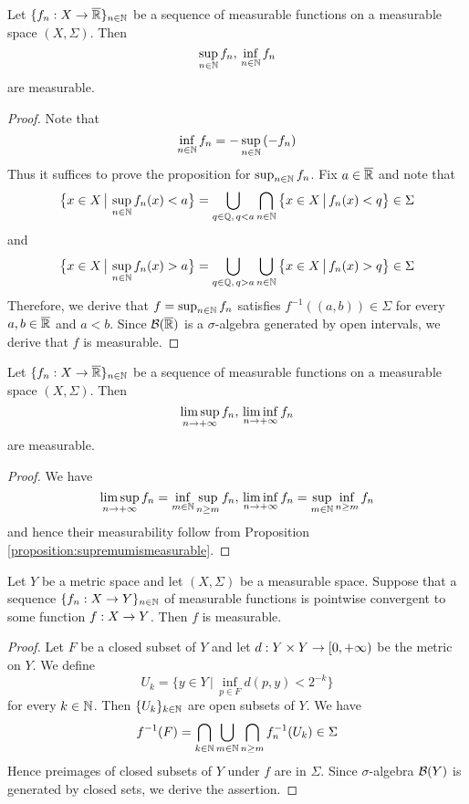 \begin{proposition}\label{proposition:supremumismeasurable}
Let $\{f_n:X\rightarrow \overline{{\mathbb R}}\}_{n\in {\mathbb N}}$ be a sequence of measurable functions on a measurable space $(X,\Sigma)$. Then
$$\sup_{n\in {\mathbb N}}f_n,\,\inf_{n\in {\mathbb N}}f_n$$
are measurable.
\end{proposition}
\begin{proof}
Note that
$$\inf_{n\in {\mathbb N}}f_n = -\sup_{n\in {\mathbb N}}\left(-f_n\right)$$
Thus it suffices to prove the proposition for $\sup_{n\in {\mathbb N}}f_n$. Fix $a\in \overline{{\mathbb R}}$ and note that
$$\big\{x\in X\,\big|\,\sup_{n\in {\mathbb N}}f_n(x)< a\big\} = \bigcup_{q\in {\mathbb Q},\,q<a}\bigcap_{n\in {\mathbb N}}\big\{x\in X\,\big|\,f_n(x)<q\big\}\in \Sigma$$
and
$$\big\{x\in X\,\big|\,\sup_{n\in {\mathbb N}}f_n(x)>a\big\} = \bigcup_{q\in {\mathbb Q},\,q>a}\bigcup_{n\in {\mathbb N}}\big\{x\in X\,\big|\,f_n(x)>q\big\}\in \Sigma$$
Therefore, we derive that $f = \sup_{n\in {\mathbb N}}f_n$ satisfies $f^{-1}\left((a,b)\right)\in \Sigma$ for every $a, b\in \overline{{\mathbb R}}$ and $a<b$. Since ${\mathcal B}(\overline{{\mathbb R}})$ is a $\sigma$-algebra generated by open intervals, we derive that $f$ is measurable.
\end{proof}

\begin{corollary}\label{corollary:otherinfiniteoperationsaremeasurable}
Let $\{f_n:X\rightarrow \overline{{\mathbb R}}\}_{n\in {\mathbb N}}$ be a sequence of measurable functions on a measurable space $(X,\Sigma)$. Then
$$\limsup_{n\rightarrow +\infty}f_n,\,\liminf_{n\rightarrow +\infty}f_n$$
are measurable.
\end{corollary}
\begin{proof}
We have
$$\limsup_{n\rightarrow +\infty}f_n =\inf_{m\in {\mathbb N}}\sup_{n\geq m}f_n,\,\liminf_{n\rightarrow +\infty}f_n = \sup_{m\in {\mathbb N}}\inf_{n\geq m}f_n$$
and hence their measurability follow from Proposition \ref{proposition:supremumismeasurable}.
\end{proof}

\begin{proposition}\label{proposition:pointwiselimitmeasurable}
Let $Y$ be a metric space and let $(X,\Sigma)$ be a measurable space. Suppose that a sequence $\{f_n:X\rightarrow Y\}_{n\in {\mathbb N}}$ of measurable functions is pointwise convergent to some function $f:X\rightarrow Y$. Then $f$ is measurable.
\end{proposition}
\begin{proof}
Let $F$ be a closed subset of $Y$ and let $d:Y\times Y\rightarrow [0,+\infty)$ be the metric on $Y$. We define
$$U_k = \big\{y \in Y\,\big|\,\inf_{p\in F} d(p,y) < 2^{-k}\big\}$$
for every $k\in {\mathbb N}$. Then $\{U_k\}_{k\in {\mathbb N}}$ are open subsets of $Y$. We have
$$f^{-1}(F) =\bigcap_{k\in {\mathbb N}}\bigcup_{m\in {\mathbb N}}\bigcap_{n\geq m}f_n^{-1}(U_k)\in \Sigma$$
Hence preimages of closed subsets of $Y$ under $f$ are in $\Sigma$. Since $\sigma$-algebra ${\mathcal B}(Y)$ is generated by closed sets, we derive the assertion.
\end{proof}

